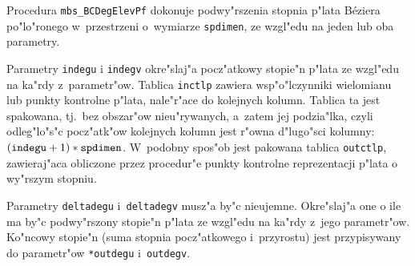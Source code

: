 \vspace{\bigskipamount}
Procedura \texttt{mbs\_BCDegElevPf} dokonuje podwy"rszenia stopnia p"lata
B\'{e}ziera po"lo"ronego w~przestrzeni o~wymiarze \texttt{spdimen}, ze
wzgl"edu na jeden lub oba parametry.

Parametry \texttt{indegu} i \texttt{indegv} okre"slaj"a pocz"atkowy stopie"n
p"lata ze wzgl"edu na ka"rdy z~parametr"ow. Tablica \texttt{inctlp} zawiera
wsp"o"lczynniki wielomianu lub punkty kontrolne p"lata, nale"r"ace do
kolejnych kolumn. Tablica ta jest spakowana, tj.\ bez obszar"ow nieu"rywanych,
a~zatem jej podzia"lka, czyli odleg"lo"s"c pocz"atk"ow kolejnych kolumn jest
r"owna d"lugo"sci kolumny:
$(\mathord{\mbox{\texttt{indegu}}}+1)*\mathord{\mbox{\texttt{spdimen}}}$.
W~podobny spos"ob jest pakowana tablica \texttt{outctlp}, zawieraj"aca
obliczone przez procedur"e punkty kontrolne reprezentacji p"lata o wy"rszym
stopniu.

Parametry \texttt{deltadegu} i~\texttt{deltadegv} musz"a by"c nieujemne.
Okre"slaj"a one o ile ma by"c podwy"rszony stopie"n p"lata ze wzgl"edu na
ka"rdy z~jego parametr"ow. Ko"ncowy stopie"n (suma stopnia pocz"atkowego
i~przyrostu) jest przypisywany do parametr"ow \texttt{*outdegu}
i~\texttt{outdegv}.


\vspace{\bigskipamount}

